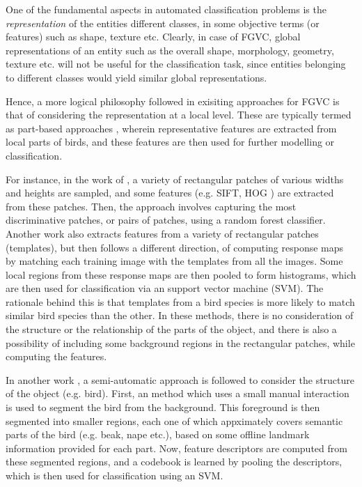 \documentclass{article}
\begin{document}
One of the fundamental aspects in automated classification problems is the \emph{representation} of the entities different classes, in some objective terms (or features) such as shape, texture etc. Clearly, in case of FGVC, global representations of an entity such as the overall shape, morphology, geometry, texture etc. will not be useful for the classification task, since entities belonging to different classes would yield similar global representations. 

Hence, a more logical philosophy followed in exisiting approaches for FGVC is that of considering the representation at a local level. These are typically termed as part-based approaches \cite{dpm,hierarchy,poof,random,codebookfree}, wherein representative features are extracted from local parts of birds, and these features are then used for further modelling or classification.  

For instance, in the work of \cite{random}, a variety of rectangular patches of various widths and heights are sampled, and some features (e.g. SIFT, HOG \cite{random,poof}) are extracted from these patches. Then, the approach involves capturing the most discriminative patches, or pairs of patches, using a random forest classifier. Another work \cite{codebookfree} also extracts features from a variety of rectangular patches (templates), but then follows a different direction, of computing response maps by matching each training image with the templates from all the images. Some local regions from these response maps are then pooled to form histograms, which are then used for classification via an support vector machine (SVM). The rationale behind this is that templates from a bird species is more likely to match similar bird species than the other. In these methods, there is no consideration of the structure or the relationship of the parts of the object, and there is also a possibility of including some background regions in the rectangular patches, while computing the features. 

In another work \cite{hierarchy}, a semi-automatic approach is followed to consider the structure of the object (e.g. bird). First, an method which uses a small manual interaction is used to segment the bird from the background. This foreground is then segmented into smaller regions, each one of which appximately covers semantic parts of the bird (e.g. beak, nape etc.), based on some offline landmark information provided for each part. Now, feature descriptors are computed from these segmented regions, and a codebook is learned by pooling the descriptors, which is then used for classification using an SVM.
     
\end{document}
